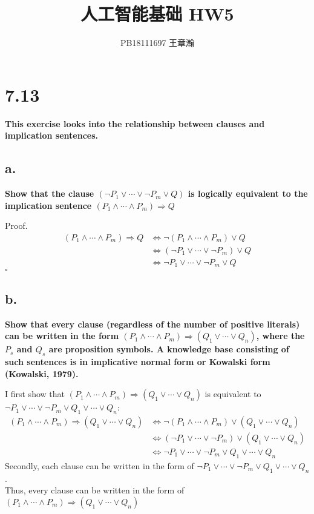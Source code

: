 \documentclass[UTF8]{article}
\title{人工智能基础 HW5}
\author{PB18111697 王章瀚}
\newcommand{\jumpLine} {\hspace*{\fill} \par}
\begin{document}
\maketitle
\section*{7.13}
\noindent\textbf{This exercise looks into the relationship between clauses and implication sentences.}
\subsection*{a.}
\noindent \textbf{Show that the clause $(\lnot P_1\lor \cdots\lor \lnot P_m\lor Q)$ is logically equivalent to the implication sentence $(P_1\land\cdots\land P_m)\Rightarrow Q$}\\
\jumpLine\noindent 
Proof.
\begin{align*}
	(P_1\land\cdots\land P_m)\Rightarrow Q &\Leftrightarrow \lnot(P_1\land\cdots\land P_m)\lor Q \\
	&\Leftrightarrow (\lnot P_1\lor\cdots\lor\lnot P_m)\lor Q \\
	&\Leftrightarrow \lnot P_1\lor\cdots\lor\lnot P_m\lor Q
\end{align*}
\hfill $\square$

\subsection*{b.}
\noindent \textbf{Show that every clause (regardless of the number of positive literals) can be written in the form $(P_1\land\cdots\land P_m)\Rightarrow (Q_1\lor\cdots\lor Q_n)$, where the $P_s$ and $Q_s$ are proposition symbols. A knowledge base consisting of such sentences is in implicative normal form or Kowalski form (Kowalski, 1979). }\\
\jumpLine\noindent 
I first show that $(P_1\land\cdots\land P_m)\Rightarrow (Q_1\lor\cdots\lor Q_n)$ is equivalent to $\lnot P_1\lor\cdots\lor\lnot P_m\lor Q_1\lor\cdots\lor Q_n$:
\begin{align*}
	(P_1\land\cdots\land P_m)\Rightarrow (Q_1\lor\cdots\lor Q_n) &\Leftrightarrow \lnot(P_1\land\cdots\land P_m)\lor (Q_1\lor\cdots\lor Q_n) \\
	&\Leftrightarrow (\lnot P_1\lor\cdots\lor\lnot P_m)\lor (Q_1\lor\cdots\lor Q_n) \\
	&\Leftrightarrow \lnot P_1\lor\cdots\lor\lnot P_m\lor Q_1\lor\cdots\lor Q_n
\end{align*}
Secondly, each clause can be written in the form of $\lnot P_1\lor\cdots\lor\lnot P_m\lor Q_1\lor\cdots\lor Q_n$. \\
Thus, every clause can be written in the form of $(P_1\land\cdots\land P_m)\Rightarrow (Q_1\lor\cdots\lor Q_n)$
\end{document}
